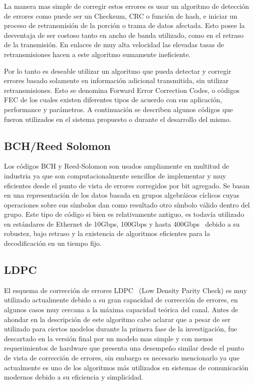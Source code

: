 La manera mas simple de corregir estos errores es usar un algoritmo de detección de errores como puede ser un Checksum, CRC o función de hash, e iniciar un proceso de retransmisión de la porción o trama de datos afectada. Esto posee la desventaja de ser costoso tanto en ancho de banda utilizado, como en el retraso de la transmisión. En enlaces de muy alta velocidad las elevadas tasas de retransmisiones hacen a este algoritmo sumamente ineficiente.

Por lo tanto es deseable utilizar un algoritmo que pueda detectar y corregir errores basado solamente en información adicional transmitida, sin utilizar retransmisiones. Esto se denomina Forward Error Correction Codes, o códigos FEC \cite{Moon:05} de los cuales existen diferentes tipos de acuerdo con sus aplicación, performance y parámetros. A continuación se describen algunos códigos que fueron utilizados en el sistema propuesto o durante el desarrollo del mismo.

\subsection{BCH/Reed Solomon}
Los códigos BCH y Reed-Solomon son usados ampliamente en multitud de industria ya que son computacionalmente sencillos de implementar y muy eficientes desde el punto de vista de errores corregidos por bit agregado. Se basan en una representación de los datos basada en grupos algebráicos cíclicos cuyas operaciones sobre sus símbolos dan como resultado otro símbolo válido dentro del grupo. 
Este tipo de código si bien es relativamente antiguo, es todavía utilizado en estándares de Ethernet de 10Gbps, 100Gbps y hasta 400Gbps~\cite{liforward} debido a su robustez, bajo retraso y la existencia de algoritmos eficientes para la decodificación en un tiempo fijo.

\subsection{LDPC}
El esquema de corrección de errores LDPC~\cite{gallagerpress} (Low Density Parity Check) es muy utilizado actualmente debido a su gran capacidad de corrección de errores, en algunos casos muy cercana a la máxima capacidad teórica del canal.
Antes de ahondar en la descripción de este algoritmo cabe aclarar que a pesar de ser utilizado para ciertos modelos durante la primera fase de la investigación, fue descartado en la versión final por un modelo mas simple y con menos requerimientos de hardware que presenta una desempeño similar desde el punto de vista de corrección de errores, sin embargo es necesario mencionarlo ya que actualmente es uno de los algoritmos más utilizados en sistemas de comunicación modernos debido a su eficiencia y simplicidad.

